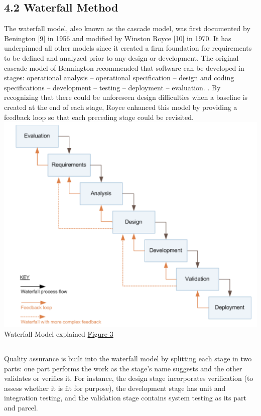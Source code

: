 \documentclass[12pt]{extreport}
\begin{document}
\subsection*{4.2	Waterfall Method}
The waterfall model, also known as the cascade model, was first documented by Benington [9] in 1956 and modified by Winston Royce [10] in 1970. It has underpinned all other models since it created a firm foundation for requirements to be defined and analyzed prior to any design or development. The original cascade model of Bennington recommended that software can be developed in stages: operational analysis – operational specification – design and coding specifications – development – testing – deployment – evaluation. . By recognizing that there could be unforeseen design difficulties when a baseline is created at the end of each stage, Royce enhanced this model by providing a feedback loop so that each preceding stage could be revisited.
\includegraphics*{image3}
\label{image3} Waterfall Model explained
\href{https://www.researchgate.net/figure/Waterfall-model-with-Royces-iterative-feedback-When-referring-to-the-waterfall-model-in_fig1_220631422}{Figure 3}

\subsection*{}
Quality assurance is built into the waterfall model by splitting each stage in two parts: one part performs the work as the stage’s name suggests and the other validates or verifies it. For instance, the design stage incorporates verification (to assess whether it is fit for purpose), the development stage has unit and integration testing, and the validation stage contains system testing as its part and parcel.
\end{document}
